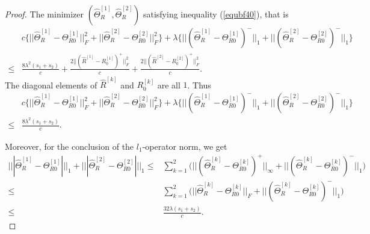 \documentclass[review]{elsarticle}
\newcommand{\1}{{\bf 1}}
\newcommand{\0}{{\bf 0}}
\newtheorem{proof}{Proof}
\begin{document}
\begin{appendices}
\begin{proof}
 The minimizer $(\widehat{\Theta}_R^{[1]},\widehat{\Theta}_R^{[2]})$ satisfying inequality (\ref{equbf40}), that is
\begin{equation}
\begin{split}
&c\Big\{||\widehat{\Theta}_R^{[1]}-\Theta_{R0}^{[1]}||_{F}^{2}+
||\widehat{\Theta}_R^{[2]}-\Theta_{R0}^{[2]}||_{F}^{2}\Big\}
+\lambda\Big\{||(\widehat{\Theta}_R^{[1]}-\Theta_{R0}^{[1]})^{-}||_1
+||(\widehat{\Theta}_R^{[2]}-\Theta_{R0}^{[2]})^{-}||_1\Big\}\\
\leq &\frac{8\lambda^2(s_1+s_2)}{c}
+\frac{2||(\widehat{R}^{[1]}-R_0^{[1]})^{+}||_{F}^{2}}{c}
+\frac{2||(\widehat{R}^{[2]}-R_0^{[2]})^{+}||_{F}^{2}}{c}.
\end{split}
\end{equation}
 The diagonal elements of $\widehat{R}^{[k]}$ and $R_{0}^{[k]}$ are all $1$. Thus
\begin{equation}
\begin{split}
&c\Big\{||\widehat{\Theta}_R^{[1]}-\Theta_{R0}^{[1]}||_{F}^{2}+
||\widehat{\Theta}_R^{[2]}-\Theta_{R0}^{[2]}||_{F}^{2}\Big\}
+\lambda\Big\{||(\widehat{\Theta}_R^{[1]}-\Theta_{R0}^{[1]})^{-}||_1
+||(\widehat{\Theta}_R^{[2]}-\Theta_{R0}^{[2]})^{-}||_1\Big\}\\
\leq &\frac{8\lambda^2(s_1+s_2)}{c}.
\end{split}
\end{equation}

 Moreover, for the conclusion of the $l_1$-operator norm, we get
\begin{equation}\label{bou}
\begin{split}
|||\widehat{\Theta}_R^{[1]}-\Theta_{R0}^{[1]}|||_1
+|||\widehat{\Theta}_R^{[2]}-\Theta_{R0}^{[2]}|||_1
\leq &
\sum_{k=1}^2\Big(||(\widehat{\Theta}_R^{[k]}-\Theta_{R0}^{[k]})^{+}||_{\infty}
+||(\widehat{\Theta}_R^{[k]}-\Theta_{R0}^{[k]})^{-}||_{1}\Big)\\
\leq &\sum_{k=1}^2\Big(||\widehat{\Theta}_R^{[k]}-\Theta_{R0}^{[k]}||_{F}
+||(\widehat{\Theta}_R^{[k]}-\Theta_{R0}^{[k]})^{-}||_{1}\Big)\\
\leq &\frac{32\lambda(s_1+s_2)}{c}.
\end{split}
\end{equation}


\end{proof}
\end{appendices}
\end{document}
